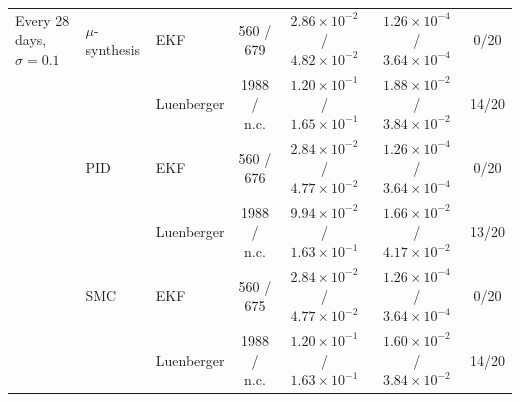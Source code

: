 \begin{table}[htbp]
\begin{tabular}{lllcccc}
\addlinespace
Every 28 days, $\sigma=0.1$ & $\mu$-synthesis & EKF & 560 / 679 & $2.86{\times}10^{-2}$ / $4.82{\times}10^{-2}$ & $1.26{\times}10^{-4}$ / $3.64{\times}10^{-4}$ & 0/20 \\
 &  & Luenberger & 1988 / n.c. & $1.20{\times}10^{-1}$ / $1.65{\times}10^{-1}$ & $1.88{\times}10^{-2}$ / $3.84{\times}10^{-2}$ & 14/20 \\
 & PID & EKF & 560 / 676 & $2.84{\times}10^{-2}$ / $4.77{\times}10^{-2}$ & $1.26{\times}10^{-4}$ / $3.64{\times}10^{-4}$ & 0/20 \\
 &  & Luenberger & 1988 / n.c. & $9.94{\times}10^{-2}$ / $1.63{\times}10^{-1}$ & $1.66{\times}10^{-2}$ / $4.17{\times}10^{-2}$ & 13/20 \\
 & SMC & EKF & 560 / 675 & $2.84{\times}10^{-2}$ / $4.77{\times}10^{-2}$ & $1.26{\times}10^{-4}$ / $3.64{\times}10^{-4}$ & 0/20 \\
 &  & Luenberger & 1988 / n.c. & $1.20{\times}10^{-1}$ / $1.63{\times}10^{-1}$ & $1.60{\times}10^{-2}$ / $3.84{\times}10^{-2}$ & 14/20 \\
\bottomrule
\end{tabular}
\end{table}
